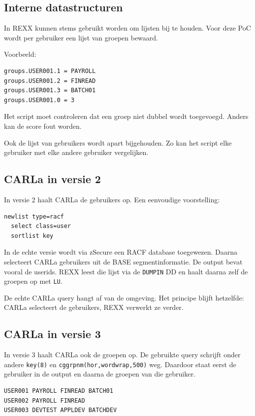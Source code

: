 \subsection*{Interne datastructuren}

In REXX kunnen stems gebruikt worden om lijsten bij te houden. Voor deze PoC wordt per gebruiker een lijst van groepen bewaard.

Voorbeeld:

\begin{verbatim}
groups.USER001.1 = PAYROLL
groups.USER001.2 = FINREAD
groups.USER001.3 = BATCH01
groups.USER001.0 = 3
\end{verbatim}

Het script moet controleren dat een groep niet dubbel wordt toegevoegd. Anders kan de score fout worden.

Ook de lijst van gebruikers wordt apart bijgehouden. Zo kan het script elke gebruiker met elke andere gebruiker vergelijken.

\subsection*{CARLa in versie 2}

In versie 2 haalt CARLa de gebruikers op. Een eenvoudige voorstelling:

\begin{verbatim}
newlist type=racf
  select class=user
  sortlist key
\end{verbatim}

In de echte versie wordt via zSecure een RACF database toegewezen. Daarna selecteert CARLa gebruikers uit de BASE segmentinformatie. De output bevat vooral de userids. REXX leest die lijst via de \texttt{DUMPIN} DD en haalt daarna zelf de groepen op met \texttt{LU}.

De echte CARLa query hangt af van de omgeving. Het principe blijft hetzelfde: CARLa selecteert de gebruikers, REXX verwerkt ze verder.

\subsection*{CARLa in versie 3}

In versie 3 haalt CARLa ook de groepen op. De gebruikte query schrijft onder andere \texttt{key(8)} en \texttt{cggrpnm(hor,wordwrap,500)} weg. Daardoor staat eerst de gebruiker in de output en daarna de groepen van die gebruiker.

\begin{verbatim}
USER001 PAYROLL FINREAD BATCH01
USER002 PAYROLL FINREAD
USER003 DEVTEST APPLDEV BATCHDEV
\end{verbatim}

